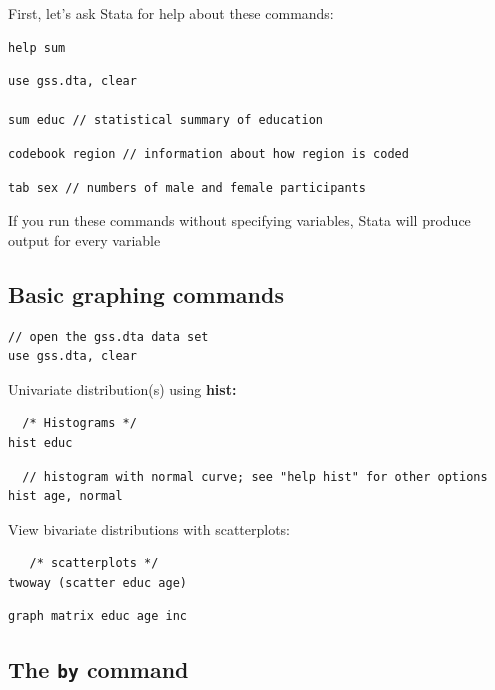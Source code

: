 \documentclass[]{book}
\begin{document}
First, let's ask Stata for help about these commands:

\begin{verbatim}
help sum
\end{verbatim}

\begin{verbatim}
use gss.dta, clear

sum educ // statistical summary of education
\end{verbatim}

\begin{verbatim}
codebook region // information about how region is coded
\end{verbatim}

\begin{verbatim}
tab sex // numbers of male and female participants
\end{verbatim}

If you run these commands without specifying variables, Stata will produce output for every variable

\hypertarget{basic-graphing-commands}{%
\subsection{Basic graphing commands}\label{basic-graphing-commands}}

\begin{verbatim}
// open the gss.dta data set
use gss.dta, clear
\end{verbatim}

Univariate distribution(s) using \textbf{hist:}

\begin{verbatim}
  /* Histograms */
hist educ
\end{verbatim}

\begin{verbatim}
  // histogram with normal curve; see "help hist" for other options
hist age, normal  
\end{verbatim}

View bivariate distributions with scatterplots:

\begin{verbatim}
   /* scatterplots */
twoway (scatter educ age)
\end{verbatim}

\begin{verbatim}
graph matrix educ age inc
\end{verbatim}

\hypertarget{the-by-command}{%
\subsection{\texorpdfstring{The \texttt{by} command}{The by command}}\label{the-by-command}}
\end{document}
